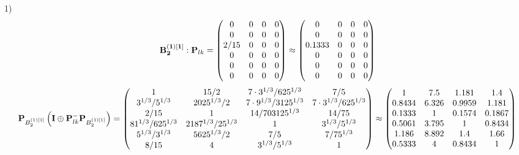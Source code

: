 \documentclass[10pt,a4paper]{article}
\begin{document}
	1)
	\[
		\bold{B_2^{(1)[1]}}: \bold{P}_{lk} = 
		\begin{pmatrix}
			{{0}}{} & {{0}}{} & {{0}}{} & {{0}}{} \\
			{{0}}{} & {{0}}{} & {{0}}{} & {{0}}{} \\
			{{2}} / {{15}} & {{0}}{} & {{0}}{} & {{0}}{} \\
			{{0}}{} & {{0}}{} & {{0}}{} & {{0}}{} \\
			{{0}}{} & {{0}}{} & {{0}}{} & {{0}}{} \\
			{{0}}{} & {{0}}{} & {{0}}{} & {{0}}{} \\
		\end{pmatrix}
		\approx
		\begin{pmatrix}
			0        & 0        & 0        & 0        \\
			0        & 0        & 0        & 0        \\
			0.1333   & 0        & 0        & 0        \\
			0        & 0        & 0        & 0        \\
			0        & 0        & 0        & 0        \\
			0        & 0        & 0        & 0        \\
		\end{pmatrix}
	\]
	\[
		\bold{P}_{B_2^{(1)[1]}}\left(\bold{I} \oplus \bold{P}_{lk}^{-}\bold{P}_{B_2^{(1)[1]}}\right) = 
		\begin{pmatrix}
			{1}{} & {{15}} / {{2}} & {{7} \cdot {3^ {1 / 3}}} / {{625^ {1 / 3}}} & {{7}} / {{5}} \\
			{{3^ {1 / 3}}} / {{5^ {1 / 3}}} & {{2025^ {1 / 3}}} / {{2}} & {{7} \cdot {9^ {1 / 3}}} / {{3125^ {1 / 3}}} & {{7} \cdot {3^ {1 / 3}}} / {{625^ {1 / 3}}} \\
			{{2}} / {{15}} & {1}{} & {{14}} / {{703125^ {1 / 3}}} & {{14}} / {{75}} \\
			{{81^ {1 / 3}}} / {{625^ {1 / 3}}} & {{2187^ {1 / 3}}} / {{2}{5^ {1 / 3}}} & {1}{} & {{3^ {1 / 3}}} / {{5^ {1 / 3}}} \\
			{{5^ {1 / 3}}} / {{3^ {1 / 3}}} & {{5625^ {1 / 3}}} / {{2}} & {{7}} / {{5}} & {{7}} / {{75^ {1 / 3}}} \\
			{{8}} / {{15}} & {{4}}{} & {{3^ {1 / 3}}} / {{5^ {1 / 3}}} & {1}{} \\
		\end{pmatrix}
		\approx
		\begin{pmatrix}
			1        & 7.5      & 1.181    & 1.4      \\
			0.8434   & 6.326    & 0.9959   & 1.181    \\
			0.1333   & 1        & 0.1574   & 0.1867   \\
			0.5061   & 3.795    & 1        & 0.8434   \\
			1.186    & 8.892    & 1.4      & 1.66     \\
			0.5333   & 4        & 0.8434   & 1        \\
		\end{pmatrix}
	\]
\end{document}
